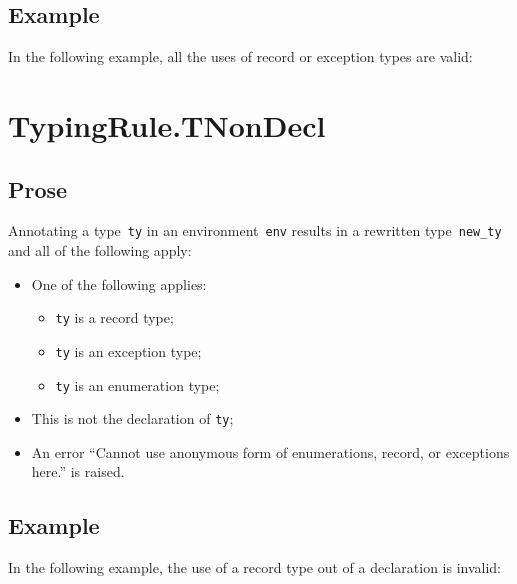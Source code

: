 \documentclass{book}
\begin{document}
\begin{itemize}
\subsection{Example}
In the following example, all the uses of record or exception types are valid:







\section{TypingRule.TNonDecl \label{sec:TypingRule.TNonDecl}}

\subsection{Prose}
Annotating a type~\texttt{ty} in an environment~\texttt{env} results in a
rewritten type~\texttt{new\_ty} and all of the following apply:
\begin{itemize}
  \item One of the following applies:
    \begin{itemize}
      \item \texttt{ty} is a record type;
      \item \texttt{ty} is an exception type;
      \item \texttt{ty} is an enumeration type;
    \end{itemize}
  \item This is not the declaration of \texttt{ty};
  \item An error ``Cannot use anonymous form of enumerations, record, or exceptions here.'' is raised.
\end{itemize}

\subsection{Example}

In the following example, the use of a record type out of a declaration is invalid:



\end{itemize}
\end{document}

